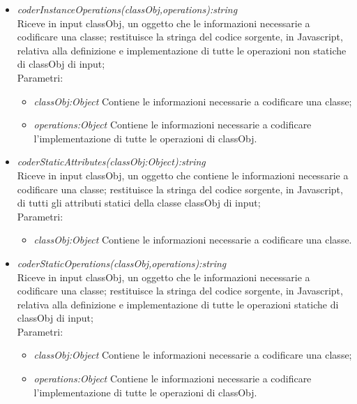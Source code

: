 \documentclass[../DefinizioneDiProdotto.tex]{subfiles}
\begin{document}
\begin{itemize}
\begin{itemize}
					\item \emph{coderInstanceOperations(classObj,operations):string} \\ 
					Riceve in input classObj, un oggetto che le informazioni necessarie a codificare una classe; 
					restituisce la stringa del codice sorgente, in Javascript, relativa alla definizione e implementazione di tutte le operazioni non statiche di classObj di input; \\
					Parametri:
					\begin{itemize}
						\item \emph{classObj:Object} Contiene le informazioni necessarie a codificare una classe;
						\item \emph{operations:Object} Contiene le informazioni necessarie a codificare l'implementazione di tutte le operazioni di classObj.
					\end{itemize}
					
					\item \emph{coderStaticAttributes(classObj:Object):string} \\ 
					Riceve in input classObj, un oggetto che contiene le informazioni necessarie a codificare una classe; 
					restituisce la stringa del codice sorgente, in Javascript, di tutti gli attributi statici della classe classObj di input; \\
					Parametri:
					\begin{itemize}
						\item \emph{classObj:Object} Contiene le informazioni necessarie a codificare una classe.
					\end{itemize}
					
					\item \emph{coderStaticOperations(classObj,operations):string} \\ 
					Riceve in input classObj, un oggetto che le informazioni necessarie a codificare una classe; 
					restituisce la stringa del codice sorgente, in Javascript, relativa alla definizione e implementazione di tutte le operazioni statiche di classObj di input; \\
					Parametri:
					\begin{itemize}
						\item \emph{classObj:Object} Contiene le informazioni necessarie a codificare una classe;
						\item \emph{operations:Object} Contiene le informazioni necessarie a codificare l'implementazione di tutte le operazioni di classObj.
					\end{itemize}
					

\end{itemize}
\end{itemize}
\end{document}
